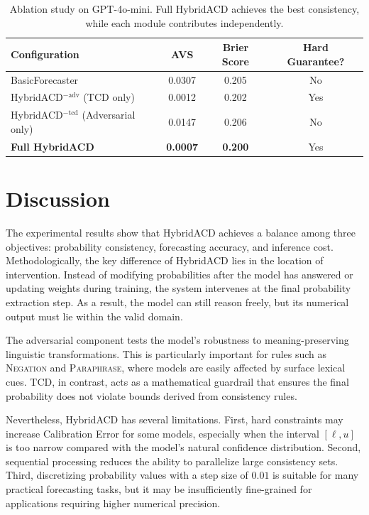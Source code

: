 \documentclass[pdflatex,sn-mathphys-num]{sn-jnl}
\begin{document}
\begin{table}[h]
\caption{Ablation study on GPT-4o-mini. Full HybridACD achieves the best consistency,
  while each module contributes independently.}
\label{tab:ablation}
\begin{tabular}{@{}lccc@{}}
\toprule
Configuration & AVS & Brier Score & Hard Guarantee? \\
\midrule
BasicForecaster                         & 0.0307 & 0.205 & No \\
HybridACD$^{-\text{adv}}$ (TCD only)    & 0.0012 & 0.202 & Yes \\
HybridACD$^{-\text{tcd}}$ (Adversarial only) & 0.0147 & 0.206 & No \\
\textbf{Full HybridACD}                 & \textbf{0.0007} & \textbf{0.200} & Yes \\
\bottomrule
\end{tabular}
\end{table}

\section{Discussion}\label{sec:discussion}

The experimental results show that HybridACD achieves a balance among three objectives: probability consistency, forecasting accuracy, and inference cost. Methodologically, the key difference of HybridACD lies in the location of intervention. Instead of modifying probabilities after the model has answered or updating weights during training, the system intervenes at the final probability extraction step. As a result, the model can still reason freely, but its numerical output must lie within the valid domain.

The adversarial component tests the model's robustness to meaning-preserving linguistic transformations. This is particularly important for rules such as \textsc{Negation} and \textsc{Paraphrase}, where models are easily affected by surface lexical cues. TCD, in contrast, acts as a mathematical guardrail that ensures the final probability does not violate bounds derived from consistency rules.

Nevertheless, HybridACD has several limitations. First, hard constraints may increase Calibration Error for some models, especially when the interval $[\ell,u]$ is too narrow compared with the model's natural confidence distribution. Second, sequential processing reduces the ability to parallelize large consistency sets. Third, discretizing probability values with a step size of $0.01$ is suitable for many practical forecasting tasks, but it may be insufficiently fine-grained for applications requiring higher numerical precision.
\end{document}
